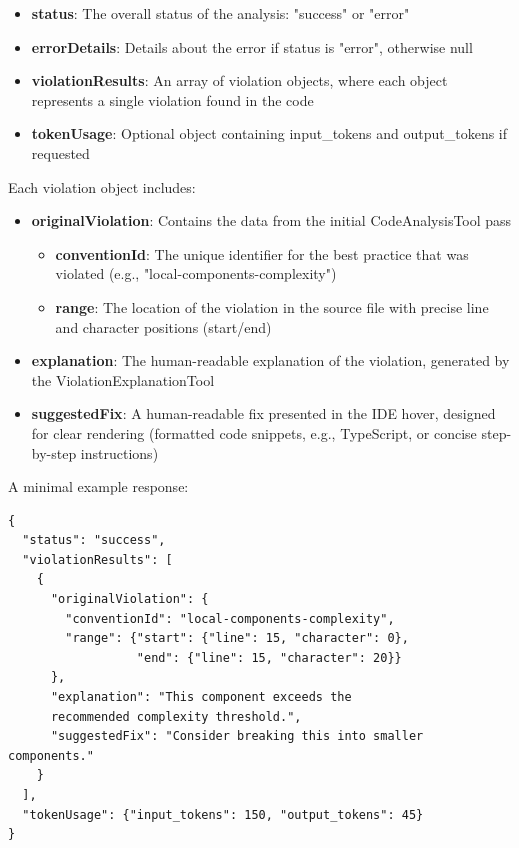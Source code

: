 \begin{spacing}{1.2}
\begin{itemize}
    \item \textbf{status}: The overall status of the analysis: "success" or "error"
    \item \textbf{errorDetails}: Details about the error if status is "error", otherwise null
    \item \textbf{violationResults}: An array of violation objects, where each object represents a single violation found in the code
    \item \textbf{tokenUsage}: Optional object containing input\_tokens and output\_tokens if requested
\end{itemize}


Each violation object includes:

\begin{itemize}
    \item \textbf{originalViolation}: Contains the data from the initial CodeAnalysisTool pass
    \begin{itemize}
        \item \textbf{conventionId}: The unique identifier for the best practice that was violated (e.g., "local-components-complexity")
        \item \textbf{range}: The location of the violation in the source file with precise line and character positions (start/end)
    \end{itemize}
    \item \textbf{explanation}: The human-readable explanation of the violation, generated by the ViolationExplanationTool
    \item \textbf{suggestedFix}: A human-readable fix presented in the IDE hover, designed for clear rendering (formatted code snippets, e.g., TypeScript, or concise step-by-step instructions)
\end{itemize}

A minimal example response:
\begin{verbatim}
{
  "status": "success",
  "violationResults": [
    {
      "originalViolation": {
        "conventionId": "local-components-complexity",
        "range": {"start": {"line": 15, "character": 0}, 
                  "end": {"line": 15, "character": 20}}
      },
      "explanation": "This component exceeds the 
	  recommended complexity threshold.",
      "suggestedFix": "Consider breaking this into smaller components."
    }
  ],
  "tokenUsage": {"input_tokens": 150, "output_tokens": 45}
}
\end{verbatim}


\end{spacing}
